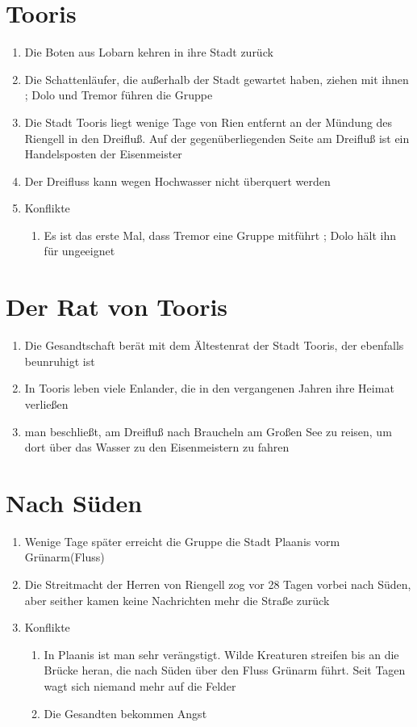 \documentclass[12pt,a4paper,onecolumn,oneside,ngerman]{book}
\newcommand{\Enland}{Enland}
\newcommand{\Schattenlaufer}{Schattenläufer}
\newcommand{\Dolo}{Dolo}
\newcommand{\Tremor}{Tremor}
\newcommand{\Lobarn}{Lobarn}
\newcommand{\Rhingell}{Riengell}
\newcommand{\Rhin}{Rien}
\newcommand{\Dreifluss}{Dreifluß}
\newcommand{\Toris}{Tooris}
\newcommand{\Planis}{Plaanis}
\newcommand{\Grunarm}{Grünarm}
\newcommand{\Braucheln}{Braucheln}
\newcommand{\Eisenmeister}{Eisenmeister}
\begin{document}
\chapter{\Toris}
\begin{enumerate}
  \item Die Boten aus {\Lobarn} kehren in ihre Stadt zurück
  \item Die {\Schattenlaufer}, die außerhalb der Stadt gewartet haben, ziehen mit ihnen ; {\Dolo} und {\Tremor} führen die Gruppe
  \item Die Stadt {\Toris} liegt wenige Tage von {\Rhin} entfernt an der Mündung des {\Rhingell} in den {\Dreifluss}. Auf der gegenüberliegenden Seite am {\Dreifluss} ist ein Handelsposten der {\Eisenmeister}
  \item Der Dreifluss kann wegen Hochwasser nicht überquert werden
  \item Konflikte
  \begin{enumerate}
    \item Es ist das erste Mal, dass {\Tremor} eine Gruppe mitführt ; {\Dolo} hält ihn für ungeeignet
  \end{enumerate}
\end{enumerate}

\chapter{Der Rat von \Toris}
\begin{enumerate}
  \item Die Gesandtschaft berät mit dem Ältestenrat der Stadt {\Toris}, der ebenfalls beunruhigt ist
  \item In {\Toris} leben viele {\Enland}er, die in den vergangenen Jahren ihre Heimat verließen
  \item man beschließt, am {\Dreifluss} nach {\Braucheln} am Großen See zu reisen, um dort über das Wasser zu den {\Eisenmeister}n zu fahren
\end{enumerate}

\chapter{Nach Süden}
\begin{enumerate}
  \item Wenige Tage später erreicht die Gruppe die Stadt {\Planis} vorm {\Grunarm}(Fluss)
  \item Die Streitmacht der Herren von {\Rhingell} zog vor 28 Tagen vorbei nach Süden, aber seither kamen keine Nachrichten mehr die Straße zurück
  \item Konflikte
  \begin{enumerate}
    \item In {\Planis} ist man sehr verängstigt. Wilde Kreaturen streifen bis an die Brücke heran, die nach Süden über den Fluss {\Grunarm} führt. Seit Tagen wagt sich niemand mehr auf die Felder
    \item Die Gesandten bekommen Angst
  \end{enumerate}
\end{enumerate}
 
\end{document}
